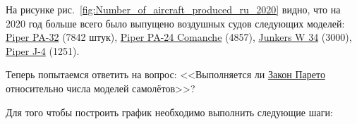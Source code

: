 На рисунке рис.~\ref{fig:Number_of_aircraft_produced_ru_2020} видно, что на 2020 год больше всего было выпущено воздушных судов следующих моделей: \href{https://www.wikidata.org/wiki/Q2096452}{Piper PA-32} (\num{7842} штук), \href{https://www.wikidata.org/wiki/Q1860367}{Piper PA-24 Comanche} (\num{4857}), \href{https://www.wikidata.org/wiki/Q694521}{Junkers W 34} (\num{3000}), \href{https://www.wikidata.org/wiki/Q4046989}{Piper J-4} (\num{1251}).


\begin{figure*}[h]

    \setlength{\fboxsep}{0pt}%
    \setlength{\fboxrule}{1pt}%

	\caption{Количество выпущенных воздушных судов по моделям, 2020.}%
    \label{fig:Number_of_aircraft_produced_ru_2020}%
\end{figure*}


Теперь попытаемся ответить на вопрос: <<Выполняется ли \href{https://clck.ru/JvaaU}{Закон Парето} относительно числа моделей самолётов>>?

Для того чтобы построить график необходимо выполнить следующие шаги:

\label{aircraft_question_2}


